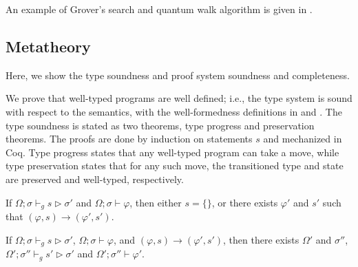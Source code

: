 An example of Grover's search and quantum walk algorithm is given in .

\subsection{\qafny Metatheory}\label{sec:theorems}

Here, we show the type soundness and proof system soundness and completeness.

We prove that well-typed \qafny programs are well defined; i.e., the
type system is sound with respect to the semantics, with the well-formedness definitions in  and .
The \qafny type soundness is stated as two theorems, type progress and preservation theorems. The proofs are done by induction on \qafny statements $s$ and mechanized in Coq. Type progress states that any well-typed \qafny program can take a move, while type preservation states that for any such move, the transitioned type and state are preserved and well-typed, respectively.

\begin{theorem}\label{thm:type-progress-oqasm}\rm 
If $\Omega;\sigma \vdash_g s \triangleright \sigma'$ and $\Omega;\sigma \vdash \varphi$, then either $s=\{\}$, or there exists $\varphi'$ and $s'$ such that $(\varphi,s)\longrightarrow (\varphi',s')$.
\end{theorem}

\begin{theorem}\label{thm:type-preservation-oqasm}\rm 
If $\Omega;\sigma \vdash_g s \triangleright \sigma'$, $\Omega;\sigma \vdash \varphi$, and $(\varphi,s)\longrightarrow (\varphi',s')$, then 
there exists $\Omega'$ and $\sigma''$, $\Omega';\sigma'' \vdash_g s' \triangleright \sigma'$ and $\Omega';\sigma'' \vdash \varphi'$.
\end{theorem}

